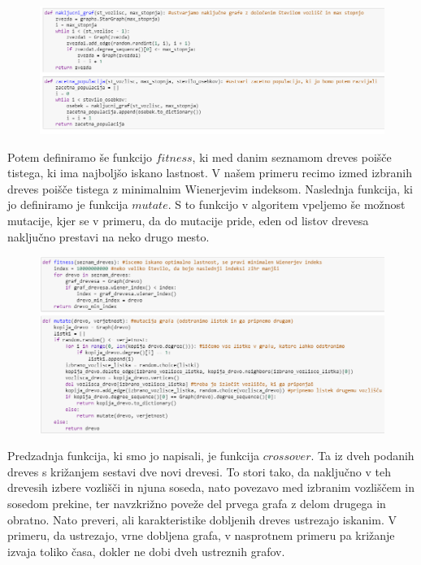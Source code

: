 \documentclass[12pt,a4paper]{amsart}
\theoremstyle{definition} %
\theoremstyle{plain} %
\begin{document}
\begin{figure}[ht]
\centering
\includegraphics[width=1\textwidth]{slika3}
\end{figure}

\pagebreak

Potem definiramo še funkcijo $fitness$, 
ki med danim seznamom dreves poišče tistega, ki ima najboljšo iskano lastnost. V našem primeru recimo
izmed izbranih dreves poišče tistega z minimalnim Wienerjevim indeksom.
Naslednja funkcija, ki jo definiramo je funkcija $mutate$.
S to funkcijo v algoritem vpeljemo še možnost mutacije, kjer se v primeru, da do mutacije pride,
 eden od listov drevesa naključno prestavi na neko drugo mesto.

\begin{figure}[ht]
\centering
\includegraphics[width=1\textwidth]{slika4}
\end{figure}

\pagebreak

Predzadnja funkcija, ki smo jo napisali, je funkcija $crossover$. 
Ta iz dveh podanih dreves s križanjem sestavi dve novi drevesi. To stori tako,
da naključno v teh drevesih izbere vozlišči in njuna soseda, nato povezavo med
izbranim vozliščem in sosedom prekine, ter navzkrižno poveže del prvega grafa z delom drugega in obratno.
Nato preveri, ali karakteristike dobljenih dreves ustrezajo iskanim. V primeru, da ustrezajo, vrne dobljena grafa, v nasprotnem
primeru pa križanje izvaja toliko časa, dokler ne dobi dveh ustreznih grafov.
\end{document}
